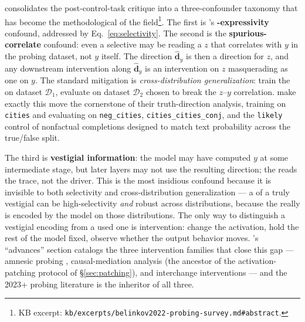 \citet{belinkov2022-probing-survey} consolidates the post-control-task
critique into a three-confounder taxonomy that has become the
methodological  of the
field\footnote{KB excerpt: \nolinkurl{kb/excerpts/belinkov2022-probing-survey.md#abstract}.}.
The first is \citet{hewitt2019-control-tasks}'s
\textbf{-expressivity} confound, addressed by Eq.~\eqref{eq:selectivity}.
The second is the \textbf{spurious-correlate} confound: even a
selective  may be reading a  $z$ that correlates with
$y$ in the probing dataset, not $y$ itself. The  direction
$\hat{\mathbf{d}}_y$ is then a direction for $z$, and any downstream
intervention along $\hat{\mathbf{d}}_y$ is an intervention on $z$
masquerading as one on $y$. The standard mitigation is
\emph{cross-distribution generalization}: train the  on dataset
$\mathcal{D}_1$, evaluate on dataset $\mathcal{D}_2$ chosen to break
the $z$--$y$ correlation. \citet[\S 1, \S 4]{marks-tegmark-2023-truth}
make exactly this move the cornerstone of their truth-direction
analysis, training on \texttt{cities} and evaluating on
\texttt{neg\_cities}, \texttt{cities\_cities\_conj}, and the
\texttt{likely} control of nonfactual completions designed to match
text probability across the true/false split.

The third is \textbf{vestigial information}: the model may have
computed $y$ at some intermediate stage, but later layers may not use
the resulting direction; the  reads the trace, not the driver.
This is the most insidious confound because it is invisible to both
selectivity and cross-distribution generalization --- a  of a
truly vestigial  can be high-selectivity \emph{and} robust
across distributions, because the  really is encoded by the
model on those distributions. The only way to distinguish a vestigial
encoding from a used one is intervention: change the activation,
hold the rest of the model fixed, observe whether the output behavior
moves. \citet{belinkov2022-probing-survey}'s ``advances'' section
catalogs the three intervention families that close this gap ---
amnesic probing \citep[Elazar et al.\ 2021, surveyed in
][]{belinkov2022-probing-survey}, causal-mediation analysis (the
ancestor of the activation-patching protocol of
\S\ref{sec:patching}), and interchange interventions --- and the
2023+ probing literature is the inheritor of all three.

